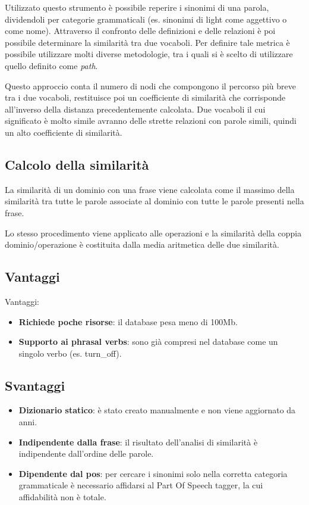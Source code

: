 \documentclass[twoside]{supsistudent}
\begin{document}
Utilizzato questo strumento è possibile reperire i sinonimi di una parola, dividendoli per categorie grammaticali (es. sinonimi di light come aggettivo o come nome).
Attraverso il confronto delle definizioni e delle relazioni è poi possibile determinare la similarità tra due vocaboli. Per definire tale metrica è possibile utilizzare molti diverse metodologie, tra i quali si è scelto di utilizzare quello definito come \textit{path}. \cite{wordNetWordSimilarity}

Questo approccio conta il numero di nodi che compongono il percorso più breve tra i due vocaboli, restituisce poi un coefficiente di similarità che corrisponde all'inverso della distanza precedentemente calcolata. Due vocaboli il cui significato è molto simile avranno delle strette relazioni con parole simili, quindi un alto coefficiente di similarità.\cite{wordNetPathSimilarity}
\subsection{Calcolo della similarità}
La similarità di un dominio con una frase viene calcolata come il massimo della similarità tra tutte le parole associate al dominio con tutte le parole presenti nella frase.

Lo stesso procedimento viene applicato alle operazioni e la similarità della coppia dominio/operazione è costituita dalla media aritmetica delle due similarità.
\subsection{Vantaggi}
Vantaggi:
 \begin{itemize}
  \item \textbf{Richiede poche risorse}: il database pesa meno di 100Mb.
  \item \textbf{Supporto ai phrasal verbs}: sono già compresi nel database come un singolo verbo (es. turn\_off).
\end{itemize}
\subsection{Svantaggi}
\begin{itemize}
  \item \textbf{Dizionario statico}: è stato creato manualmente e non viene aggiornato da anni.  
  \item \textbf{Indipendente dalla frase}: il risultato dell'analisi di similarità è indipendente dall'ordine delle parole.
  \item \textbf{Dipendente dal pos}: per cercare i sinonimi solo nella corretta categoria grammaticale è necessario affidarsi al Part Of Speech tagger, la cui affidabilità non è totale.
\end{itemize}
\newpage
\end{document}
